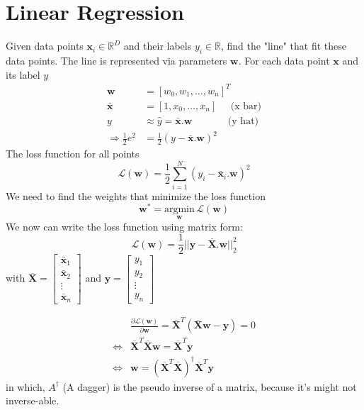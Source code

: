 \chapter{Linear Regression}

 Given data points $\textbf{x}_i \in \mathbb{R}^D$ and their labels $y_i \in \mathbb{R}$, find the "line" that fit these data points. The line is represented via parameters $\textbf{w}$. For each data point $\textbf{x}$ and its label $y$
\begin{align*}
	\textbf{w} &= [w_0, w_1, \dots, w_n]^T \\
	\bar{\textbf{x}} &= [1, x_0, \dots, x_n] \;\;\;\;\; \text{(x bar)}\\
	y &\approx \hat{y} = \bar{\textbf{x}} . \textbf{w} \;\;\;\;\;\;\;\;\;\;\;\;\; \text{(y hat)}\\
	\Rightarrow \frac{1}{2}e^2 &= \frac{1}{2} \left(y - \bar{\textbf{x}}.\textbf{w}\right)^2
\end{align*}
The loss function for all points
\begin{equation}
	\mathcal{L}(\textbf{w}) = \frac{1}{2} \sum_{i=1}^{N} \left(y_i - \bar{\textbf{x}}_i.\textbf{w}\right) ^2
\end{equation}
We need to find the weights that minimize the loss function
\begin{equation}
	\textbf{w}^* = \underset{\textbf{w}}{\text{argmin}}\,\mathcal{L}(\textbf{w})
\end{equation}
We now can write the loss function using matrix form:
\begin{equation}
	\mathcal{L}(\textbf{w}) = \frac{1}{2} ||\textbf{y}-\overline{\textbf{X}}.\textbf{w}||^2_2
\end{equation}
with $\overline{\textbf{X}} = \begin{bmatrix}
	\bar{\textbf{x}}_1 \\
	\bar{\textbf{x}}_2 \\
	\vdots \\
	\bar{\textbf{x}}_n
\end{bmatrix}$
and $\textbf{y} = \begin{bmatrix}
	y_1 \\
	y_2 \\
	\vdots \\
	y_n	
\end{bmatrix}$

\begin{align}
	&\frac{\partial\mathcal{L}(\textbf{w})}{\partial\textbf{w}} = \overline{\textbf{X}}^T\left(\overline{\textbf{X}}\textbf{w}-\textbf{y}\right) = 0 \\
	\iff &\overline{\textbf{X}}^T\overline{\textbf{X}}\textbf{w} = \overline{\textbf{X}}^T\textbf{y} \\
	\iff &\textbf{w} = \left(\overline{\textbf{X}}^T\overline{\textbf{X}}\right)^\dagger\overline{\textbf{X}}^T\textbf{y}
\end{align}
in which, $A^\dagger$ (A dagger) is the pseudo inverse of a matrix, because it's might not inverse-able. 

